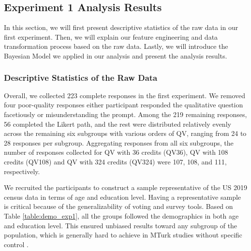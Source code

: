 \subsection{Experiment 1 Analysis Results} \label{results-1-quan}
In this section, 
we will first present descriptive statistics 
of the raw data in our first experiment. 
Then, we will explain our feature engineering 
and data transformation process 
based on the raw data. 
Lastly, we will introduce the Bayesian Model 
we applied in our analysis 
and present the analysis results.

\subsubsection{Descriptive Statistics of the Raw Data}
    
Overall, we collected 223 complete responses in the first experiment. 
We removed four poor-quality responses 
either participant responded the qualitative question facetiously 
or misunderstanding the prompt. 
Among the 219 remaining responses, 
56 completed the Likert path, 
and the rest were distributed relatively evenly 
across the remaining six subgroups with various orders of QV, 
ranging from 24 to 28 responses per subgroup. 
Aggregating responses from all six subgroups, 
the number of responses collected for QV with 36 credits (QV36), 
QV with 108 credits (QV108) and QV with 324 credits (QV324) 
were 107, 108, and 111, respectively. 

We recruited the participants 
to construct a sample 
representative of the US 2019 census data 
in terms of age and education level. 
Having a representative sample is critical because of the generalizability of voting and survey tools. 
Based on Table \ref{table:demo_exp1}, 
all the groups followed the demographics in both age and education level. 
This ensured unbiased results toward any subgroup of the population, 
which is generally hard to achieve in MTurk studies without specific control \cite{difallah2018demographics}.

